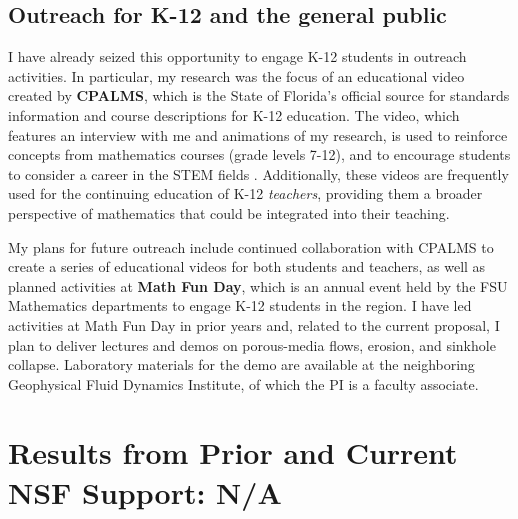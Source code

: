 \documentclass[12pt]{article}
\begin{document}
\subsection{Outreach for K-12 and the general public}

I have already seized this opportunity to engage K-12 students in outreach activities. In particular, my research was the focus of an educational video created by {\bf CPALMS}, which is the State of Florida's official source for standards information and course descriptions for K-12 education. The video, which features an interview with me and animations of my research, is used to reinforce concepts from mathematics courses (grade levels 7-12), and to encourage students to consider a career in the STEM fields \cite{CPALMS}. Additionally, these videos are frequently used for the continuing education of K-12 {\em teachers}, providing them a broader perspective of mathematics that could be integrated into their teaching.
 
My plans for future outreach include continued collaboration with CPALMS to create a series of educational videos for both students and teachers, as well as planned activities at {\bf Math Fun Day}, which is an annual event held by the FSU Mathematics departments to engage K-12 students in the region. I have led activities at Math Fun Day in prior years and, related to the current proposal, I plan to deliver lectures and demos on porous-media flows, erosion, and sinkhole collapse.
Laboratory materials for the demo are available at the neighboring Geophysical Fluid Dynamics Institute, of which the PI is a faculty associate.

\section{Results from Prior and Current NSF Support: N/A}


\newpage
\setcounter{page}{1}

%

\end{document}
